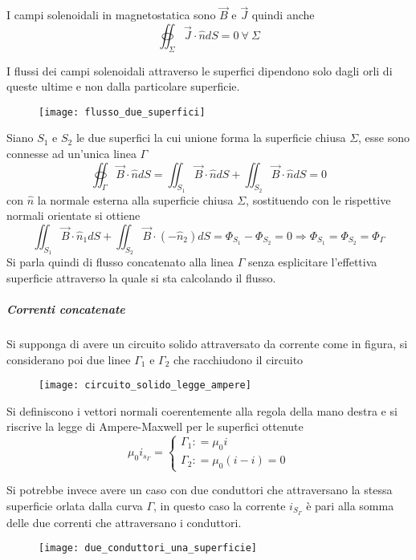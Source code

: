 I campi solenoidali in magnetostatica sono $\vec{B}$ e $\vec{J}$ quindi anche
$$
\oiint_\Sigma \vec{J}\cdot\hat{n} dS = 0\ \forall\ \Sigma
$$

I flussi dei campi solenoidali attraverso le superfici dipendono solo dagli orli di
queste ultime e non dalla particolare superficie.
\begin{figure}[H]
\centering
\texttt{[image: flusso\_due\_superfici]}
\end{figure}
Siano $S_1$ e $S_2$ le due superfici la cui unione forma la superficie chiusa $\Sigma$, esse
sono connesse ad un'unica linea $\Gamma$
$$
\oiint_\Gamma \vec{B}\cdot\hat{n}dS = \iint_{S_1} \vec{B}\cdot\hat{n}dS + \iint_{S_2} \vec{B}\cdot\hat{n}dS = 0
$$
con $\hat{n}$ la normale esterna alla superficie chiusa $\Sigma$, sostituendo con le 
rispettive normali orientate si ottiene
$$
\iint_{S_1} \vec{B}\cdot\hat{n}_1dS + \iint_{S_2} \vec{B}\cdot\left(-\hat{n}_2\right)dS = 
\Phi_{S_1} - \Phi_{S_2} = 0 \Rightarrow \Phi_{S_1} = \Phi_{S_2} = \Phi_\Gamma
$$
Si parla quindi di flusso concatenato alla linea $\Gamma$ senza esplicitare l'effettiva
superficie attraverso la quale si sta calcolando il flusso.

\subparagraph{Correnti concatenate}
Si supponga di avere un circuito solido attraversato da corrente come in figura,
si considerano poi due linee $\Gamma_1$ e $\Gamma_2$ che racchiudono il circuito
\begin{figure}[H]
\centering
\texttt{[image: circuito\_solido\_legge\_ampere]}
\end{figure}

Si definiscono i vettori normali coerentemente alla regola della mano destra
e si riscrive la legge di Ampere-Maxwell per le superfici ottenute
$$
\mu_0 i_{s_\Gamma} =
\begin{cases}
\Gamma_1 : = \mu_0 i\\
\Gamma_2 : = \mu_0(i-i) = 0
\end{cases}
$$

Si potrebbe invece avere un caso con due conduttori che attraversano la stessa superficie
orlata dalla curva $\Gamma$, in questo caso la corrente $i_{S_\Gamma}$ è pari alla
somma delle due correnti che attraversano i conduttori.
\begin{figure}[H]
\centering
\texttt{[image: due\_conduttori\_una\_superficie]}
\end{figure}
\newpage
